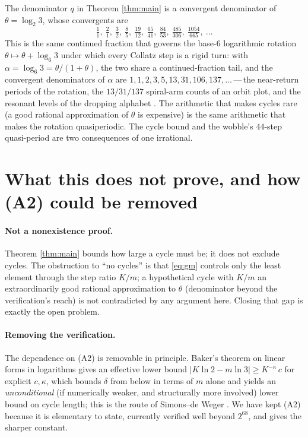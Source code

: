 \documentclass[11pt]{article}
\theoremstyle{definition}
\begin{document}
The denominator $q$ in Theorem \ref{thm:main} is a convergent denominator of
$\theta = \log_2 3$, whose convergents are
\[
  \tfrac11,\ \tfrac21,\ \tfrac32,\ \tfrac85,\ \tfrac{19}{12},\ \tfrac{65}{41},\
  \tfrac{84}{53},\ \tfrac{485}{306},\ \tfrac{1054}{665},\ \ldots
\]
This is the same continued fraction that governs the base-$6$ logarithmic
rotation $\theta \mapsto \theta + \log_6 3$ under which every Collatz step is a
rigid turn: with $\alpha = \log_6 3 = \theta/(1+\theta)$, the two share a
continued-fraction tail, and the convergent denominators of $\alpha$ are
$1,1,2,3,5,13,31,106,137,\ldots$\,---\,the near-return periods of the rotation,
the $13/31/137$ spiral-arm counts of an orbit plot, and the resonant levels of
the dropping alphabet \cite{droppingdict}. The arithmetic that makes cycles rare
(a good rational approximation of $\theta$ is expensive) is the same arithmetic
that makes the rotation quasiperiodic. The cycle bound and the wobble's $44$-step
quasi-period are two consequences of one irrational.

\section{What this does not prove, and how (A2) could be removed}\label{sec:remarks}

\paragraph{Not a nonexistence proof.} Theorem \ref{thm:main} bounds how large a
cycle must be; it does not exclude cycles. The obstruction to ``no cycles'' is
that \eqref{eq:gm} controls only the least element through the step ratio $K/m$;
a hypothetical cycle with $K/m$ an extraordinarily good rational approximation to
$\theta$ (denominator beyond the verification's reach) is not contradicted by any
argument here. Closing that gap is exactly the open problem.

\paragraph{Removing the verification.} The dependence on (A2) is removable in
principle. Baker's theorem on linear forms in logarithms gives an effective lower
bound $|K\ln 2 - m\ln 3| \ge K^{-\kappa}\,c$ for explicit $c,\kappa$, which bounds
$\delta$ from below in terms of $m$ alone and yields an \emph{unconditional}
(if numerically weaker, and structurally more involved) lower bound on cycle
length; this is the route of Simons--de Weger \cite{simonsdeweger}. We have kept
(A2) because it is elementary to state, currently verified well beyond
$2^{68}$, and gives the sharper constant.
\end{document}
